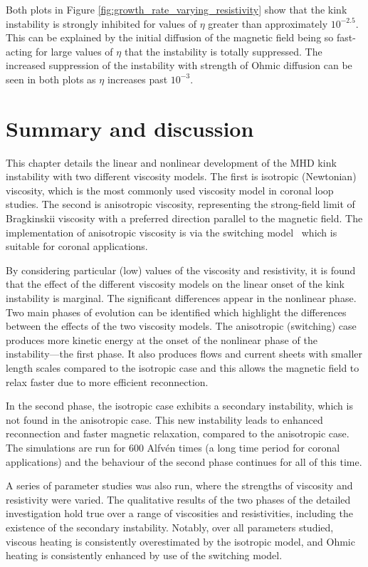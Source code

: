 Both plots in Figure \ref{fig:growth_rate_varying_resistivity} show that the kink instability is strongly inhibited for values of $\eta$ greater than approximately $10^{-2.5}$. This can be explained by the initial diffusion of the magnetic field being so fast-acting for large values of $\eta$ that the instability is totally suppressed. The increased suppression of the instability with strength of Ohmic diffusion can be seen in both plots as $\eta$ increases past $10^{-3}$.

\section{Summary and discussion}
\label{sec:conclusions}

This chapter details the linear and nonlinear development of the MHD kink
instability with two different viscosity models. The first is
isotropic (Newtonian) viscosity, which is the most commonly used
viscosity model in coronal loop studies. The second is anisotropic viscosity, representing the strong-field limit of Bragkinskii viscosity with a preferred direction parallel to the magnetic field. The implementation of anisotropic viscosity is via the switching model~\cite{mactaggartBraginskiiMagnetohydrodynamicsArbitrary2017} which is suitable for coronal applications.

By considering particular (low) values of the viscosity and resistivity, it is found that the effect of the different viscosity models on the linear onset of the kink instability is marginal. The significant differences appear in the nonlinear phase. Two main phases of evolution can be identified which highlight the differences between the effects of the two viscosity models. The anisotropic (switching) case produces more kinetic energy at the onset of the nonlinear phase of the instability---the first phase. It also produces flows and current sheets with smaller length scales compared to the isotropic case and this allows the magnetic field to relax faster due to more efficient reconnection. 

In the second phase, the isotropic case exhibits a secondary instability, which is not found in the anisotropic case. This new instability leads to enhanced reconnection and faster magnetic relaxation, compared to the anisotropic case.  The simulations are run for $600$ Alfv\'en times (a long time period for coronal applications) and the behaviour of the second phase continues for all of this time.

A series of parameter studies was also run, where the strengths of viscosity and resistivity were varied. The qualitative results of the two phases of the detailed investigation hold true over a range of viscosities and resistivities, including the existence of the secondary instability. Notably, over all parameters studied, viscous heating is consistently overestimated by the isotropic model, and Ohmic heating is consistently enhanced by use of the switching model.


